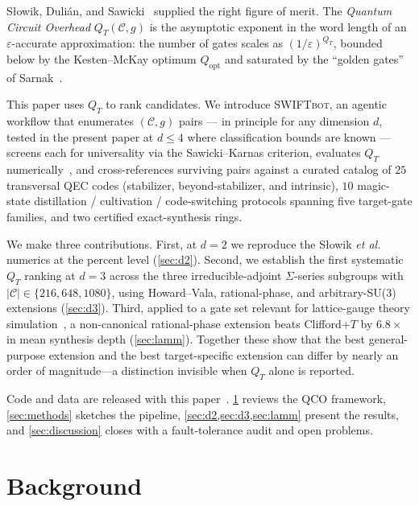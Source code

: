 \documentclass[twocolumn,superscriptaddress,showpacs,nofootinbib,notitlepage,preprintnumbers,secnumarabic,amssymb, nobibnotes, aps, prd]{revtex4-2}
\newcommand{\QT}{Q_{T}}              %
\newcommand{\Popt}{Q_{\mathrm{opt}}} %
\newcommand{\SWIFTbot}{\textsc{SWIFTbot}\xspace}
\begin{document}
S{\l}owik, Duli{\'a}n, and Sawicki~\cite{Slowik:2025qco} supplied the right figure of merit. The \emph{Quantum Circuit Overhead} $\QT(\mathcal{C},g)$ is the asymptotic exponent in the word length of an $\varepsilon$-accurate approximation: the number of gates scales as $(1/\varepsilon)^{\QT}$, bounded below by the Kesten--McKay optimum $\Popt$ and saturated by the ``golden gates'' of Sarnak~\cite{Sarnak:2015}.

This paper uses $\QT$ to rank candidates. We introduce \SWIFTbot, an agentic workflow that enumerates $(\mathcal{C},g)$ pairs --- in principle for any dimension $d$, tested in the present paper at $d\leq 4$ where classification bounds are known --- screens each for universality via the Sawicki--Karnas criterion, evaluates $\QT$ numerically~\cite{Slowik:2025qco}, and cross-references surviving pairs against a curated catalog of $25$ transversal QEC codes (stabilizer, beyond-stabilizer, and intrinsic), $10$ magic-state distillation / cultivation / code-switching protocols spanning five target-gate families, and two certified exact-synthesis rings.

We make three contributions. First, at $d=2$ we reproduce the S{\l}owik \emph{et al.} numerics at the percent level (\cref{sec:d2}). Second, we establish the first systematic $\QT$ ranking at $d=3$ across the three irreducible-adjoint $\Sigma$-series subgroups with $|\mathcal{C}|\in\{216,648,1080\}$, using Howard--Vala, rational-phase, and arbitrary-SU(3) extensions (\cref{sec:d3}). Third, applied to a gate set relevant for lattice-gauge theory simulation~\cite{Lamm:2019bik,Gustafson:2022xdt,Kurkcuoglu:2025quoctit}, a non-canonical rational-phase extension beats Clifford$+T$ by $6.8\times$ in mean synthesis depth (\cref{sec:lamm}). Together these show that the best general-purpose extension and the best target-specific extension can differ by nearly an order of magnitude---a distinction invisible when $\QT$ alone is reported.

Code and data are released with this paper~\cite{swiftbot_github}. \cref{sec:qco} reviews the QCO framework, \cref{sec:methods} sketches the pipeline, \cref{sec:d2,sec:d3,sec:lamm} present the results, and \cref{sec:discussion} closes with a fault-tolerance audit and open problems.

\section{Background}\label{sec:qco}
\end{document}
